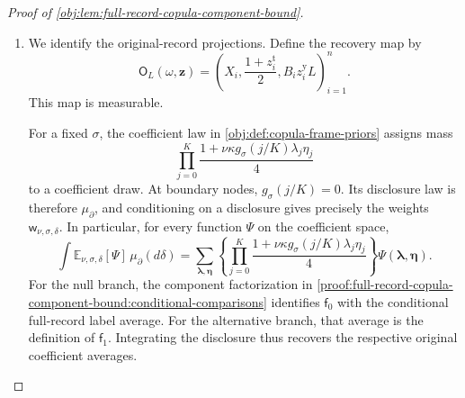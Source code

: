 \begin{proof}[Proof of \cref{obj:lem:full-record-copula-component-bound}]
\begin{enumerate}
For \(d_{\mathrm{ser}}\in\{6,11\}\), the elementary inequality
\(r_{\mathrm{occ}}\le2^{r_{\mathrm{occ}}-1}\) gives
\[
\begin{aligned}
\sum_{r_{\mathrm{occ}}=2}^{\infty}
 r_{\mathrm{occ}}^{d_{\mathrm{ser}}}
 \zeta_{\mathrm{occ}}^{r_{\mathrm{occ}}}
 &\le
 2^{d_{\mathrm{ser}}}\zeta_{\mathrm{occ}}^2
 \sum_{r_{\mathrm{occ}}=2}^{\infty}
 (2^{d_{\mathrm{ser}}}\zeta_{\mathrm{occ}})^{r_{\mathrm{occ}}-2}\\
 &=
 \frac{2^{d_{\mathrm{ser}}}\zeta_{\mathrm{occ}}^2}
      {1-2^{d_{\mathrm{ser}}}\zeta_{\mathrm{occ}}}
 \le2^{d_{\mathrm{ser}}+1}\zeta_{\mathrm{occ}}^2.
\end{aligned}
\]
The geometric series converges because
\[
0\le\zeta_{\mathrm{occ}}\le24\,\frac nK,
\qquad
2^{11}\zeta_{\mathrm{occ}}
 \le2^{11}\cdot24\cdot2^{-40}<\frac12.
\]
Here we used \(e<3\) and \(2^{40}n\le K\). Consequently,
\[
\begin{aligned}
\int\mathcal A\,d\mu
 &\le
 2^{26}24^2\,
 \frac{a^4u^4\varepsilon^2n^2}{K}
 \le
 \frac{2^{38}a^4u^4\varepsilon^2n^2}{K},\\
\int\mathcal B\,d\mu
 &\le
 2^{31}24^4\,
 \frac{a^4u^4\varepsilon^2n^4}{MK^2}
 \le
 \frac{2^{56}a^4u^4\varepsilon^2n^4}{MK^2},
\end{aligned}
\]
since \(2^{26}24^2<2^{38}\) and \(2^{31}24^4<2^{56}\).
The budgets are measurable finite sums. The uniform component denominator bounds and finite label alphabet make them bounded for fixed parameters, hence integrable under the probability law \(\mu\).

\item\label{proof:full-record-copula-component-bound:record-projections}
We identify the original-record projections. Define the recovery map by
\[
\mathsf O_L(\omega,\mathbf z)
 =
 \left(
 X_i,\frac{1+z_i^{\mathrm t}}2,B_i z_i^{\mathrm y}L
 \right)_{i=1}^{n}.
\]
This map is measurable.

For a fixed \(\sigma\), the coefficient law in
\cref{obj:def:copula-frame-priors} assigns mass
\[
\prod_{j=0}^{K}
 \frac{1+\nu\kappa g_\sigma(j/K)\lambda_j\eta_j}{4}
\]
to a coefficient draw. At boundary nodes, \(g_\sigma(j/K)=0\). Its disclosure law is therefore \(\mu_{\partial}\), and conditioning on a disclosure gives precisely the weights
\(\mathsf w_{\nu,\sigma,\delta}\). In particular, for every function \(\Psi\) on the coefficient space,
\[
\int
 \mathbb E_{\nu,\sigma,\delta}[\Psi]\,
 \mu_{\partial}(d\delta)
 =
 \sum_{\boldsymbol\lambda,\boldsymbol\eta}
 \left\{
 \prod_{j=0}^{K}
 \frac{1+\nu\kappa g_\sigma(j/K)\lambda_j\eta_j}{4}
 \right\}
 \Psi(\boldsymbol\lambda,\boldsymbol\eta).
\]
For the null branch, the component factorization in \cref{proof:full-record-copula-component-bound:conditional-comparisons} identifies
\(\mathsf f_0\) with the conditional full-record label average. For the alternative branch, that average is the definition of \(\mathsf f_1\). Integrating the disclosure thus recovers the respective original coefficient averages.


\end{enumerate}
\end{proof}
